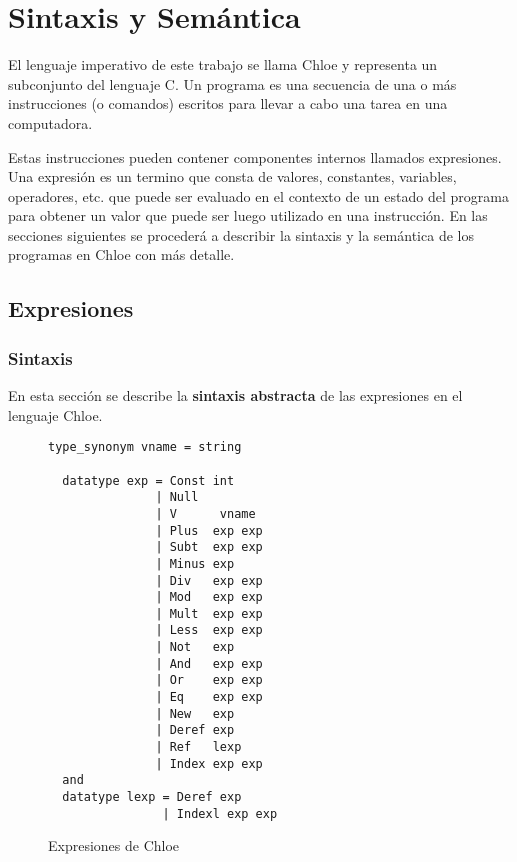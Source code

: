 \chapter{Sintaxis y Semántica}\label{chapter:semantics}

El lenguaje imperativo de este trabajo se llama Chloe y representa un subconjunto del lenguaje C.
Un programa es una secuencia de una o más instrucciones (o comandos) escritos para llevar a cabo una tarea en una computadora.
\begin{comment}
Cada una de estas instrucciones representa una instrucción que la máquina ejecutará.
\end{comment}
Estas instrucciones pueden contener componentes internos llamados expresiones.
Una expresión es un termino que consta de valores, constantes, variables, operadores, etc. que puede ser evaluado en el contexto de un estado del programa para obtener un valor que puede ser luego utilizado en una instrucción.
En las secciones siguientes se procederá a describir la sintaxis y la semántica de los programas en Chloe con más detalle.


\section{Expresiones}\label{section:expressions}

\subsection{Sintaxis}\label{subsection:syntax_expressions}

En esta sección se describe la \textbf{sintaxis abstracta} de las expresiones en el lenguaje Chloe.

\begin{figure}
  \begin{lstlisting}[frame=single]
  type_synonym vname = string

  datatype exp = Const int
               | Null
               | V      vname
               | Plus  exp exp
               | Subt  exp exp
               | Minus exp
               | Div   exp exp
               | Mod   exp exp
               | Mult  exp exp
               | Less  exp exp
               | Not   exp
               | And   exp exp
               | Or    exp exp
               | Eq    exp exp
               | New   exp
               | Deref exp
               | Ref   lexp
               | Index exp exp
  and
  datatype lexp = Deref exp
                | Indexl exp exp
  \end{lstlisting}

  \caption{Expresiones de Chloe}
  \label{fig:chloe_expressions}
\end{figure}

